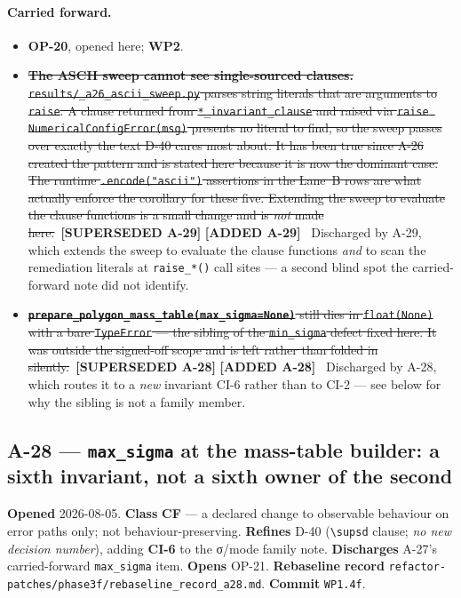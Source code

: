 \documentclass[
  10pt,
]{article}
\providecommand{\tightlist}{%
  \setlength{\itemsep}{0pt}\setlength{\parskip}{0pt}}
\newcommand{\amdstrike}[1]{\sout{#1}}
\newcommand{\amdstrike}[1]{\textcolor{supcolor}{#1}}
\newcommand{\amdnew}[1]{{\color{amdcolor}\footnotesize\textbf{[ADDED #1]}}\ }
\newcommand{\supsd}[2]{{\color{supcolor}\amdstrike{#2}}~{\color{amdcolor}\footnotesize\textbf{[SUPERSEDED #1]}}}
\begin{document}
\paragraph{Carried forward.}
\begin{itemize}
\tightlist
\item \textbf{OP-20}, opened here; \textbf{WP2}.
\item \supsd{A-29}{\textbf{The ASCII sweep cannot see single-sourced clauses.} \texttt{results/\allowbreak{}\_a26\_ascii\_sweep.py} parses string literals that are arguments to \texttt{raise}. A clause returned from \texttt{*\_invariant\_clause} and raised via \texttt{raise NumericalConfigError(msg)} presents no literal to find, so the sweep passes over exactly the text D-40 cares most about. It has been true since A-26 created the pattern and is stated here because it is now the dominant case. The runtime \texttt{.encode("ascii")} assertions in the Lane~B rows are what actually enforce the corollary for these five. Extending the sweep to evaluate the clause functions is a small change and is \emph{not} made here.} \amdnew{A-29} Discharged by A-29, which extends the sweep to evaluate the clause functions \emph{and} to scan the remediation literals at \texttt{raise\_*()} call sites --- a second blind spot the carried-forward note did not identify.
\item \supsd{A-28}{\textbf{\texttt{prepare\_polygon\_mass\_table(max\_sigma=None)}} still dies in \texttt{float(None)} with a bare \texttt{TypeError} --- the sibling of the \texttt{min\_sigma} defect fixed here. It was outside the signed-off scope and is left rather than folded in silently.} \amdnew{A-28} Discharged by A-28, which routes it to a \emph{new} invariant CI-6 rather than to CI-2 --- see below for why the sibling is not a family member.
\end{itemize}

\hypertarget{a-28}{%
\subsection{A-28 --- \texttt{max\_sigma} at the mass-table builder: a sixth invariant, not a sixth owner of the second}\label{a-28}}

\textbf{Opened} 2026-08-05. \textbf{Class} \textbf{CF} --- a declared change to observable behaviour on error paths only; not behaviour-preserving. \textbf{Refines} D-40 (\texttt{\textbackslash supsd} clause; \emph{no new decision number}), adding \textbf{CI-6} to the σ/mode family note. \textbf{Discharges} A-27's carried-forward \texttt{max\_sigma} item. \textbf{Opens} OP-21. \textbf{Rebaseline record} \texttt{refactor-patches/phase3f/rebaseline\_record\_a28.md}. \textbf{Commit} \texttt{WP1.4f}.
\end{document}

